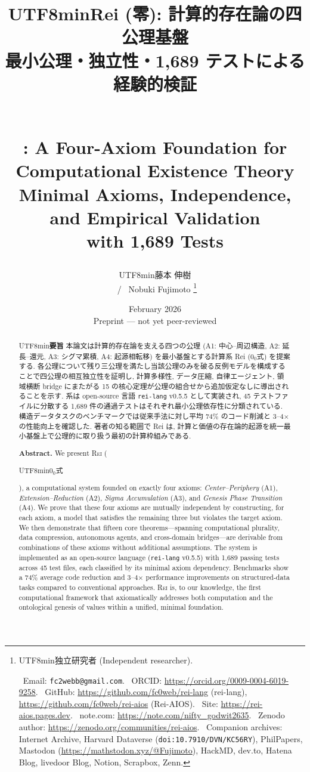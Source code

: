\documentclass[11pt,a4paper]{article}
\title{%
  \begin{CJK}{UTF8}{min}\textbf{Rei (零): 計算的存在論の四公理基盤}\\[0.3em]
  \large 最小公理・独立性・1,689 テストによる経験的検証\end{CJK}\\[0.7em]
  \textbf{\Rei{}: A Four-Axiom Foundation for\\
  Computational Existence Theory}\\[0.5em]
  \large Minimal Axioms, Independence, and Empirical Validation\\
  with 1,689 Tests
}
\author{
  {\begin{CJK}{UTF8}{min}藤本 伸樹\end{CJK}} \ / \ Nobuki Fujimoto%
  \thanks{%
    \begin{CJK}{UTF8}{min}独立研究者 (Independent researcher).\end{CJK}%
    \ Email: \texttt{fc2webb@gmail.com}.%
    \ ORCID: \url{https://orcid.org/0009-0004-6019-9258}.%
    \ GitHub: \url{https://github.com/fc0web/rei-lang} (rei-lang),
    \url{https://github.com/fc0web/rei-aios} (Rei-AIOS).%
    \ Site: \url{https://rei-aios.pages.dev}.%
    \ note.com: \url{https://note.com/nifty_godwit2635}.%
    \ Zenodo author: \url{https://zenodo.org/communities/rei-aios}.%
    \ Companion archives: Internet Archive, Harvard Dataverse (\texttt{doi:10.7910/DVN/KC56RY}),
    PhilPapers, Mastodon (\url{https://mathstodon.xyz/@Fujimoto}),
    HackMD, dev.to, Hatena Blog, livedoor Blog, Notion, Scrapbox, Zenn.%
  }
}
\date{February 2026\\{\small Preprint --- not yet peer-reviewed}}
\newcommand{\Rei}{\textsc{Rei}}
\begin{document}
\maketitle

\begin{abstract}
\noindent\begin{CJK}{UTF8}{min}\textbf{要旨}\quad
本論文は計算的存在論を支える四つの公理 (A1: 中心--周辺構造, A2: 延長--還元, A3: シグマ累積, A4: 起源相転移) を最小基盤とする計算系 Rei ($0_0$式) を提案する. 各公理について残り三公理を満たし当該公理のみを破る反例モデルを構成することで四公理の相互独立性を証明し, 計算多様性, データ圧縮, 自律エージェント, 領域横断 bridge にまたがる 15 の核心定理が公理の組合せから追加仮定なしに導出されることを示す. 系は open-source 言語 \texttt{rei-lang} v0.5.5 として実装され, 45 テストファイルに分散する 1{,}689 件の通過テストはそれぞれ最小公理依存性に分類されている. 構造データタスクのベンチマークでは従来手法に対し平均 74\% のコード削減と 3--4$\times$ の性能向上を確認した. 著者の知る範囲で Rei は, 計算と価値の存在論的起源を統一最小基盤上で公理的に取り扱う最初の計算枠組みである.\end{CJK}

\medskip
\noindent\textbf{Abstract.}\quad
We present \Rei{} (\begin{CJK}{UTF8}{min}$0_0$式\end{CJK}), a computational system founded on exactly four axioms: \emph{Center--Periphery} (A1), \emph{Extension--Reduction} (A2), \emph{Sigma Accumulation} (A3), and \emph{Genesis Phase Transition} (A4). We prove that these four axioms are mutually independent by constructing, for each axiom, a model that satisfies the remaining three but violates the target axiom. We then demonstrate that fifteen core theorems---spanning computational plurality, data compression, autonomous agents, and cross-domain bridges---are derivable from combinations of these axioms without additional assumptions. The system is implemented as an open-source language (\texttt{rei-lang} v0.5.5) with 1,689 passing tests across 45 test files, each classified by its minimal axiom dependency. Benchmarks show a 74\% average code reduction and 3--4$\times$ performance improvements on structured-data tasks compared to conventional approaches. \Rei{} is, to our knowledge, the first computational framework that axiomatically addresses both computation and the ontological genesis of values within a unified, minimal foundation.
\end{abstract}
\end{document}
